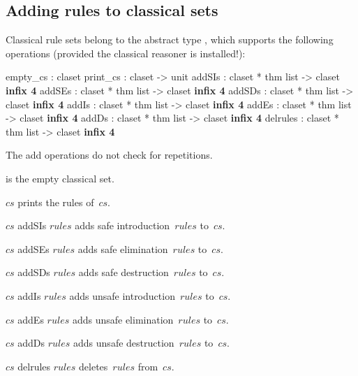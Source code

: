 \subsection{Adding rules to classical sets}
Classical rule sets belong to the abstract type , which
supports the following operations (provided the classical reasoner is
installed!):
\begin{ttbox} 
empty_cs    : claset
print_cs    : claset -> unit
addSIs      : claset * thm list -> claset                 \hfill{\bf infix 4}
addSEs      : claset * thm list -> claset                 \hfill{\bf infix 4}
addSDs      : claset * thm list -> claset                 \hfill{\bf infix 4}
addIs       : claset * thm list -> claset                 \hfill{\bf infix 4}
addEs       : claset * thm list -> claset                 \hfill{\bf infix 4}
addDs       : claset * thm list -> claset                 \hfill{\bf infix 4}
delrules    : claset * thm list -> claset                 \hfill{\bf infix 4}
\end{ttbox}
The add operations do not check for repetitions.
\begin{ttdescription}
\item[\ttindexbold{empty_cs}] is the empty classical set.

\item[\ttindexbold{print_cs} $cs$] prints the rules of~$cs$.

\item[$cs$ addSIs $rules$] 
adds safe introduction~$rules$ to~$cs$.

\item[$cs$ addSEs $rules$] 
adds safe elimination~$rules$ to~$cs$.

\item[$cs$ addSDs $rules$] 
adds safe destruction~$rules$ to~$cs$.

\item[$cs$ addIs $rules$] 
adds unsafe introduction~$rules$ to~$cs$.

\item[$cs$ addEs $rules$] 
adds unsafe elimination~$rules$ to~$cs$.

\item[$cs$ addDs $rules$] 
adds unsafe destruction~$rules$ to~$cs$.

\item[$cs$ delrules $rules$] 
deletes~$rules$ from~$cs$.
\end{ttdescription}

